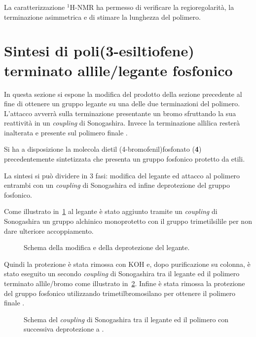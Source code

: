 La caratterizzazione $^1$H-NMR ha permesso di verificare la regioregolarità, la terminazione asimmetrica e di stimare la lunghezza del polimero.
\section{Sintesi di poli(3-esiltiofene) terminato allile/legante fosfonico}
In questa sezione si espone la modifica del prodotto  della sezione precedente al fine di ottenere un gruppo legante su una delle due terminazioni del polimero. L'attacco avverrà sulla terminazione presentante un bromo sfruttando la sua reattività in un \emph{coupling} di Sonogashira. Invece la terminazione allilica resterà inalterata e presente sul polimero finale .

 Si ha a disposizione la molecola dietil (4-bromofenil)fosfonato ({\bf 4}) precedentemente sintetizzata che presenta un gruppo fosfonico protetto da etili. 

La sintesi si può dividere in 3 fasi: modifica del legante ed attacco al polimero entrambi con un \emph{coupling} di Sonogashira ed infine deprotezione del gruppo fosfonico.

Come illustrato in~\ref{fig:legante} al legante è stato aggiunto tramite un \emph{coupling} di Sonogashira un gruppo alchinico monoprotetto con il gruppo trimetilsilile per non dare ulteriore accoppiamento. 
\begin{figure}
\caption{\footnotesize{Schema della modifica e della deprotezione del legante.}
\label{fig:legante}}
\end{figure}

Quindi la protezione è stata rimossa con KOH e, dopo purificazione su colonna, è stato eseguito un secondo \emph{coupling} di Sonogashira tra il legante  ed il polimero  terminato allile/bromo come illustrato in~\ref{fig:p3ht-legante}. Infine è stata rimossa la protezione del gruppo fosfonico utilizzando trimetilbromosilano per ottenere il polimero finale . 
\begin{figure}
\caption{\footnotesize{Schema del \emph{coupling} di Sonogashira tra il legante  ed il polimero  con successiva deprotezione a .}
\label{fig:p3ht-legante}}
\end{figure}

